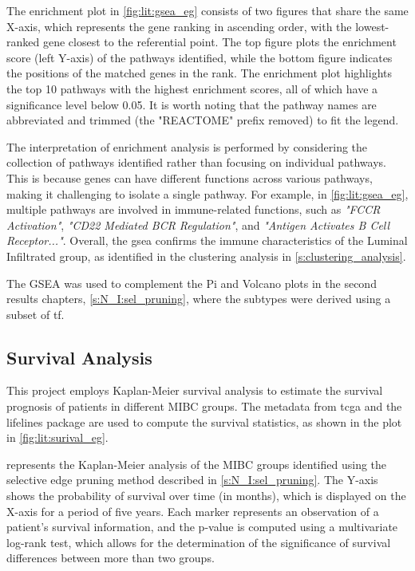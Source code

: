 The enrichment plot in \cref{fig:lit:gsea_eg} consists of two figures that share the same X-axis, which represents the gene ranking in ascending order, with the lowest-ranked gene closest to the referential point. The top figure plots the enrichment score (left Y-axis) of the pathways identified, while the bottom figure indicates the positions of the matched genes in the rank. The enrichment plot highlights the top 10 pathways with the highest enrichment scores, all of which have a significance level below 0.05. It is worth noting that the pathway names are abbreviated and trimmed (the "REACTOME" prefix removed) to fit the legend.

The interpretation of enrichment analysis is performed by considering the collection of pathways identified rather than focusing on individual pathways. This is because genes can have different functions across various pathways, making it challenging to isolate a single pathway. For example, in \cref{fig:lit:gsea_eg}, multiple pathways are involved in immune-related functions, such as \textit{"FCCR Activation"}, \textit{"CD22 Mediated BCR Regulation"}, and \textit{"Antigen Activates B Cell Receptor..."}. Overall, the \acrshort{gsea} confirms the immune characteristics of the Luminal Infiltrated group, as identified in the clustering analysis in \cref{s:clustering_analysis}.

The GSEA was used to complement the Pi and Volcano plots in the second results chapters, \cref{s:N_I:sel_pruning}, where the subtypes were derived using a subset of \acrlong{tf}.

\subsection{Survival Analysis} \label{s:lit:survival}

This project employs Kaplan-Meier survival analysis \cite{Kaplan1958-iy} to estimate the survival prognosis of patients in different MIBC groups. The metadata from \acrlong{tcga} and the lifelines package \citep{Davidson-Pilon2019-fu} are used to compute the survival statistics, as shown in the plot in \cref{fig:lit:surival_eg}.

 represents the Kaplan-Meier analysis of the MIBC groups identified using the selective edge pruning method described in \cref{s:N_I:sel_pruning}. The Y-axis shows the probability of survival over time (in months), which is displayed on the X-axis for a period of five years. Each marker represents an observation of a patient's survival information, and the p-value is computed using a multivariate log-rank test, which allows for the determination of the significance of survival differences between more than two groups.

